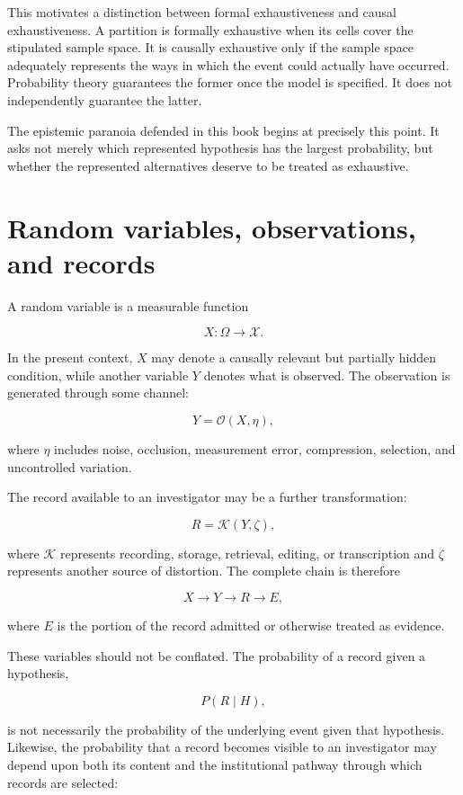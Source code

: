 This motivates a distinction between formal exhaustiveness and causal exhaustiveness. A partition is formally exhaustive when its cells cover the stipulated sample space. It is causally exhaustive only if the sample space adequately represents the ways in which the event could actually have occurred. Probability theory guarantees the former once the model is specified. It does not independently guarantee the latter.

The epistemic paranoia defended in this book begins at precisely this point. It asks not merely which represented hypothesis has the largest probability, but whether the represented alternatives deserve to be treated as exhaustive.

\section{Random variables, observations, and records}
\label{sec:a3}

A random variable is a measurable function

\[
X:\Omega\to\mathcal X.
\]

In the present context, \(X\) may denote a causally relevant but partially hidden condition, while another variable \(Y\) denotes what is observed. The observation is generated through some channel:

\[
Y=\mathcal O(X,\eta),
\]

where \(\eta\) includes noise, occlusion, measurement error, compression, selection, and uncontrolled variation.

The record available to an investigator may be a further transformation:

\[
R=\mathcal K(Y,\zeta),
\]

where \(\mathcal K\) represents recording, storage, retrieval, editing, or transcription and \(\zeta\) represents another source of distortion. The complete chain is therefore

\[
X\longrightarrow Y\longrightarrow R\longrightarrow E,
\]

where \(E\) is the portion of the record admitted or otherwise treated as evidence.

These variables should not be conflated. The probability of a record given a hypothesis,

\[
P(R\mid H),
\]

is not necessarily the probability of the underlying event given that hypothesis. Likewise, the probability that a record becomes visible to an investigator may depend upon both its content and the institutional pathway through which records are selected:

